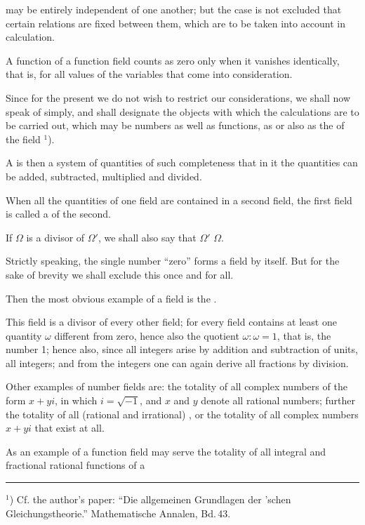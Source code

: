 may be entirely independent of one another; but the case is not excluded that certain relations are fixed between them, which are to be taken into account in calculation.

A function of a function field counts as zero only when it vanishes identically, that is, for all values of the variables that come into consideration.

Since for the present we do not wish to restrict our considerations, we shall now speak of  simply, and shall designate the objects with which the calculations are to be carried out, which may be numbers as well as functions, as  or also as the  of the field $^1$).

A  is then a system of quantities of such completeness that in it the quantities can be added, subtracted, multiplied and divided.

When all the quantities of one field are contained in a second field, the first field is called a  of the second.

If $\Omega$ is a divisor of $\Omega'$, we shall also say that $\Omega'$  $\Omega$.

Strictly speaking, the single number ``zero'' forms a field by itself. But for the sake of brevity we shall exclude this once and for all.

Then the most obvious example of a field is the .

This field is a divisor of every other field; for every field contains at least one quantity $\omega$ different from zero, hence also the quotient $\omega:\omega=1$, that is, the number 1; hence also, since all integers arise by addition and subtraction of units, all integers; and from the integers one can again derive all fractions by division.

Other examples of number fields are: the totality of all complex numbers of the form $x+yi$, in which $i=\sqrt{-1}$, and $x$ and $y$ denote all rational numbers; further the totality of all (rational and irrational) , or the totality of all complex numbers $x+yi$ that exist at all.

As an example of a function field may serve the totality of all integral and fractional rational functions of a

\par\noindent\rule{4cm}{0.4pt}\par
{\footnotesize $^1$) Cf. the author's paper: ``Die allgemeinen Grundlagen der 'schen Gleichungstheorie.'' Mathematische Annalen, Bd.\,43.}

